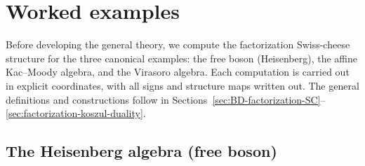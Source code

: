 \section{Worked examples}
\label{sec:worked-examples-factorization}

Before developing the general theory, we compute the factorization
Swiss-cheese structure for the three canonical examples: the free boson
(Heisenberg), the affine Kac--Moody algebra, and the Virasoro
algebra. Each computation is carried out in explicit coordinates,
with all signs and structure maps written out. The general
definitions and constructions follow in
Sections~\ref{sec:BD-factorization-SC}--\ref{sec:factorization-koszul-duality}.

\subsection{The Heisenberg algebra (free boson)}
\label{subsec:heisenberg-SC}

